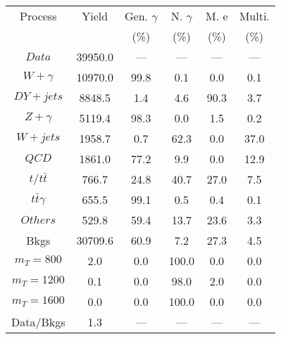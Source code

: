 \begin{figure}
\begin{minipage}[c]{0.32\textwidth}
\tiny{
\begin{tabular}{cccccc}
\hline
Process & Yield & Gen. $\gamma$ & N. $\gamma$ & M. e & Multi. \\
 &  & (\%) & (\%) & (\%) & (\%)  \\
\hline
                                                                      $ Data $ &  39950.0 &  --- &  --- &  --- &  ---\\
$ W+\gamma $ &  10970.0 &  99.8 &  0.1 &  0.0 &  0.1\\
$ DY+jets $ &  8848.5 &  1.4 &  4.6 &  90.3 &  3.7\\
$ Z+\gamma $ &  5119.4 &  98.3 &  0.0 &  1.5 &  0.2\\
$ W+jets $ &  1958.7 &  0.7 &  62.3 &  0.0 &  37.0\\
$ QCD $ &  1861.0 &  77.2 &  9.9 &  0.0 &  12.9\\
$ t/t\bar{t} $ &  766.7 &  24.8 &  40.7 &  27.0 &  7.5\\
$ t\bar{t}\gamma $ &  655.5 &  99.1 &  0.5 &  0.4 &  0.1\\
$ Others $ &  529.8 &  59.4 &  13.7 &  23.6 &  3.3\\
Bkgs &  30709.6 &  60.9 &  7.2 &  27.3 &  4.5\\
$ m_{T} = 800 $ &  2.0 &  0.0 &  100.0 &  0.0 &  0.0\\
$ m_{T} = 1200 $ &  0.1 &  0.0 &  98.0 &  2.0 &  0.0\\
$ m_{T} = 1600 $ &  0.0 &  0.0 &  100.0 &  0.0 &  0.0\\
Data/Bkgs &  1.3 &  --- &  --- &  --- &  ---\\
\hline
\end{tabular}
}
\end{minipage}
\end{figure}

